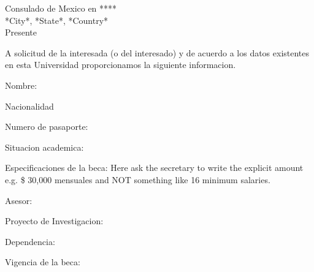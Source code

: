 \documentclass[10pt]{article}
\begin{document}
\noindent
Consulado de Mexico en **** \\
*City*, *State*, *Country*  \\
Presente


\bigskip
\bigskip
\bigskip
\bigskip
\noindent
A solicitud de la interesada (o del interesado) y de acuerdo a los datos existentes en esta Universidad proporcionamos la siguiente informacion. 


\bigskip
\bigskip
\noindent
Nombre:


\bigskip
\bigskip
\noindent
Nacionalidad

\bigskip
\bigskip
\noindent
Numero de pasaporte:

\bigskip
\bigskip
\noindent
Situacion academica:


\bigskip
\bigskip
\noindent
Especificaciones de la beca:  Here ask the secretary to write the explicit amount e.g. \$ 30,000 mensuales and NOT something like 16 minimum salaries. 

\bigskip
\bigskip
\noindent
Asesor:

\bigskip
\bigskip
\noindent
Proyecto de Investigacion:

\bigskip
\bigskip
\noindent
Dependencia:


\bigskip
\bigskip
\noindent
Vigencia de la beca:
\end{document}
